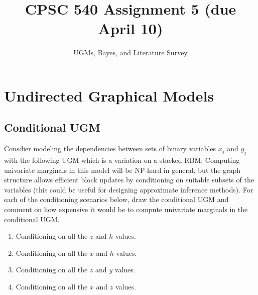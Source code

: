 \documentclass{article}
\begin{document}
\def\blu#1{{\color{blu}#1}}
\def\gre#1{{\color{gre}#1}}
\def\red#1{{\color{red}#1}}
\def\norm#1{\|#1\|}
\newcommand{\argmin}[1]{\mathop{\hbox{argmin}}_{#1}}
\newcommand{\argmax}[1]{\mathop{\hbox{argmax}}_{#1}}
\def\R{\mathbb{R}}
\newcommand{\fig}[2]{\texttt{[image: a5f/\#2]}}
\newcommand{\centerfig}[2]{\begin{center}\texttt{[image: a5f/\#2]}\end{center}}
\def\items#1{\begin{itemize}#1\end{itemize}}
\def\enum#1{\begin{enumerate}#1\end{enumerate}}
\def\argmax{\mathop{\rm arg\,max}}
\def\argmin{\mathop{\rm arg\,min}}
\def\half{\frac 1 2}
\newcommand{\code}[1]{}
\newcommand{\alignStar}[1]{\begin{align*}#1\end{align*}}
\newcommand{\mat}[1]{\begin{bmatrix}#1\end{bmatrix}}

\newcommand{\p}{\mathbb{P}}

\title{CPSC 540 Assignment 5 (due April 10)}
\author{UGMs, Bayes, and Literature Survey}
\date{}
\maketitle

\section{Undirected Graphical Models}

\subsection{Conditional UGM}

Consdier modeling the dependencies between sets of binary variables $x_j$ and $y_j$ with the following UGM which is a variation on a stacked RBM:
Computing univariate marginals in this model will be NP-hard in general, but the graph structure allows efficient block updates by conditioning on suitable subsets of the variables (this could be useful for designing approximate inference methods).
For each of the conditioning scenarios below, \blu{draw the conditional UGM and comment on how expensive it would be to compute univariate marginals} in the conditional UGM.
\enum{
\item Conditioning on all the $z$ and $h$ values.
\item Conditioning on all the $x$ and $h$ values.
\item Conditioning on all the $z$ and $y$ values.
\item Conditioning on all the $x$ and $z$ values.
}
\end{document}
